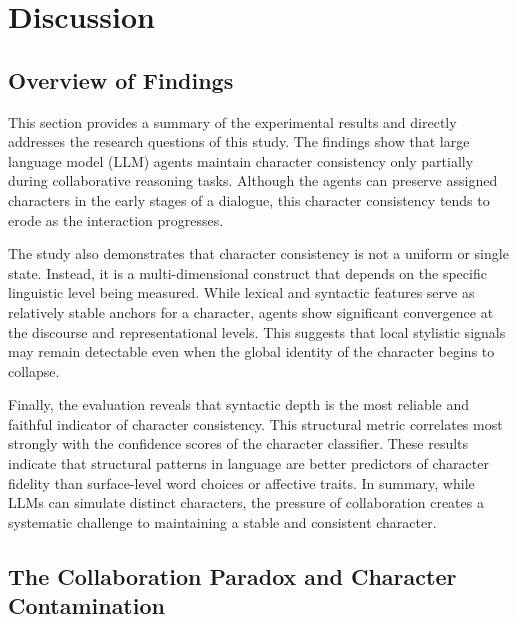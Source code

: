 \documentclass{article}
\begin{document}
\section{Discussion}

\subsection{Overview of Findings}

This section provides a summary of the experimental results and directly addresses the research questions of this study. The findings show that large language model (LLM) agents maintain character consistency only partially during collaborative reasoning tasks. Although the agents can preserve assigned characters in the early stages of a dialogue, this character consistency tends to erode as the interaction progresses.

The study also demonstrates that character consistency is not a uniform or single state. Instead, it is a multi-dimensional construct that depends on the specific linguistic level being measured. While lexical and syntactic features serve as relatively stable anchors for a character, agents show significant convergence at the discourse and representational levels. This suggests that local stylistic signals may remain detectable even when the global identity of the character begins to collapse.

Finally, the evaluation reveals that syntactic depth is the most reliable and faithful indicator of character consistency. This structural metric correlates most strongly with the confidence scores of the character classifier. These results indicate that structural patterns in language are better predictors of character fidelity than surface-level word choices or affective traits. In summary, while LLMs can simulate distinct characters, the pressure of collaboration creates a systematic challenge to maintaining a stable and consistent character.

\subsection{The Collaboration Paradox and Character Contamination}
\end{document}
